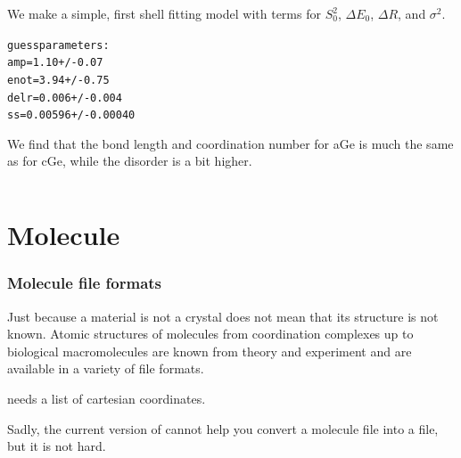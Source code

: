 \documentclass[10pt, xcolor=x11names, compress]{beamer}
\begin{document}
\begin{frame}[fragile]
\begin{columns}
\begin{column}{0.6\linewidth}
      \medskip

      We make a simple, first shell fitting model with terms for
      $S_0^2$, $\Delta E_0$, $\Delta R$, and $\sigma^2$.
      \begin{center}
        \begin{minipage}{0.8\linewidth}
          \begin{exampleblock}{}
\begin{alltt}
\scriptsize
guess parameters:                                                            
  amp   =   1.10      +/-   0.07
  enot  =   3.94      +/-   0.75
  delr  =   0.006     +/-   0.004
  ss    =   0.00596   +/-   0.00040
\end{alltt}
          \end{exampleblock}

        \end{minipage}
      \end{center}
      We find that the bond length and coordination number for aGe is
      much the same as for cGe, while the disorder is a bit higher.
    \end{column}
  \end{columns}
\end{frame}
\section{Molecule}
\label{sec:molecule}

\begin{frame}
  \frametitle{Molecule file formats}
  Just because a material is not a crystal does not mean that its
  structure is not known.  Atomic structures of molecules from
  coordination complexes up to biological macromolecules are known
  from theory and experiment and are available in a variety of file
  formats.

  \bigskip

  \begin{block}{}
    \begin{center}
      {\feff} needs a list of cartesian coordinates.
    \end{center}
  \end{block}

  \bigskip

  Sadly, the current version of {\artemis} cannot help you convert a
  molecule file into a  file, but it is not hard.
\end{frame}
\end{document}
